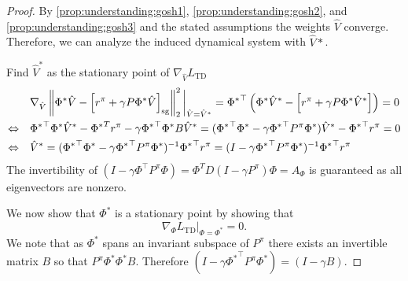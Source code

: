 \begin{proof}
    By \autoref{prop:understanding:gosh1}, \autoref{prop:understanding:gosh2}, and \autoref{prop:understanding:gosh3} and the stated assumptions the weights $\hat{V}$ converge. Therefore, we can analyze the induced dynamical system with $\hat{V}*$.

    Find $\hat{V}^*$ as the stationary point of $\nabla_{\hat{V}} L_\text{TD}$
    \begin{align*}
        & \nabla_{\hat{V}} \left\lVert \Phi^* \hat{V} - \left[r^\pi + \gamma P\Phi^* \hat{V}\right]_\text{sg} \right\rVert_2^2\bigg|_{\hat{V} = \hat{V}^*} = {\Phi^*}^\top\left(\Phi^* \hat{V}^* - \left[r^\pi + \gamma P\Phi^* \hat{V}^*\right]\right) = 0 \\
        \Leftrightarrow \quad & {\Phi^*}^\top \Phi^* \hat{V}^* - {\Phi^*}^T r^\pi - \gamma {\Phi^*}^\top  \Phi^* B \hat{V}^* = ({\Phi^*}^\top \Phi^* - \gamma {\Phi^*}^\top P^\pi \Phi^*) \hat{V}^* - {\Phi^*}^\top r^\pi = 0\\
        \Leftrightarrow \quad & \hat{V}^* = ({\Phi^*}^\top \Phi^* - \gamma {\Phi^*}^\top P^\pi \Phi^*)^{-1} {\Phi^*}^\top r^\pi = (I - \gamma {\Phi^*}^\top P^\pi \Phi^*)^{-1} {\Phi^*}^\top r^\pi
    \end{align*}
    The invertibility of $(I - \gamma \Phi^\top P^\pi \Phi) = \Phi^T D (I - \gamma P^\pi) \Phi = A_\Phi$ is guaranteed as all eigenvectors are nonzero.

    We now show that $\Phi^*$ is a stationary point by showing that $$\nabla_\Phi L_\text{TD}|_{\Phi = \Phi^*} = 0.$$ We note that as $\Phi^*$ spans an invariant subspace of $P^\pi$ there exists an invertible matrix $B$ so that $P^\pi \Phi^*  \Phi^* B$. Therefore $(I - \gamma {\Phi^*}^\top P^\pi \Phi^*) = (I - \gamma B)$.


\end{proof}
